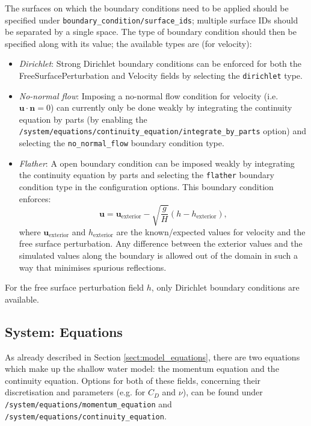 \documentclass[a4paper,11pt]{report}
\begin{document}
The surfaces on which the boundary conditions need to be applied should be specified under \texttt{boundary\_condition/surface\_ids}; multiple surface IDs should be separated by a single space. The type of boundary condition should then be specified along with its value; the available types are (for velocity):
\begin{itemize}
   \item \textit{Dirichlet}: Strong Dirichlet boundary conditions can be enforced for both the FreeSurfacePerturbation and Velocity fields by selecting the \texttt{dirichlet} type.
   \item \textit{No-normal flow}: Imposing a no-normal flow condition for velocity (i.e. $\mathbf{u}\cdot\mathbf{n} = 0$) can currently only be done weakly by integrating the continuity equation by parts (by enabling the \texttt{/system/equations/continuity\_equation/integrate\_by\_parts} option) and selecting the \texttt{no\_normal\_flow} boundary condition type.
   \item \textit{Flather}: A \cite{Flather_1976} open boundary condition can be imposed weakly by integrating the continuity equation by parts and selecting the \texttt{flather} boundary condition type in the configuration options. This boundary condition enforces:
   \begin{equation}
      \mathbf{u} = \mathbf{u}_{\mathrm{exterior}} - \sqrt{\frac{g}{H}}\left(h - h_{\mathrm{exterior}}\right),
   \end{equation}
   where $\mathbf{u}_{\mathrm{exterior}}$ and $h_{\mathrm{exterior}}$ are the known/expected values for velocity and the free surface perturbation. Any difference between the exterior values and the simulated values along the boundary is allowed out of the domain in such a way that minimises spurious reflections.
\end{itemize}

For the free surface perturbation field $h$, only Dirichlet boundary conditions are available.

\subsection{System: Equations}
As already described in Section \ref{sect:model_equations}, there are two equations which make up the shallow water model: the momentum equation and the continuity equation. Options for both of these fields, concerning their discretisation and parameters (e.g. for $C_D$ and $\nu$), can be found under \texttt{/system/equations/momentum\_equation} and \texttt{/system/equations/continuity\_equation}.
\end{document}
